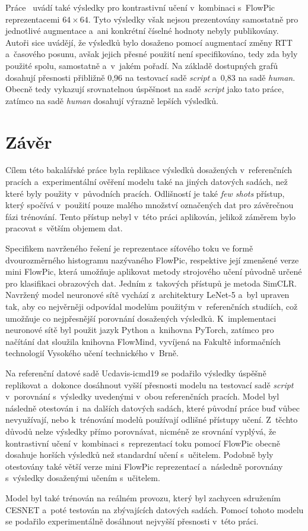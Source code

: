 Práce~\cite{flowpic_augmentations} uvádí také výsledky pro kontrastivní učení v~kombinaci s~FlowPic reprezentacemi $64\times64$. Tyto výsledky však nejsou prezentovány samostatně pro jednotlivé augmentace a~ani konkrétní číselné hodnoty nebyly publikovány. Autoři sice uvádějí, že výsledků bylo dosaženo pomocí augmentací změny RTT a~časového posunu, avšak jejich přesné použití není specifikováno, tedy zda byly použité spolu, samostatně a~v~jakém pořadí. Na základě dostupných grafů dosahují přesnosti přibližně 0,96 na testovací sadě \textit{script} a~0,83 na sadě \textit{human}. Obecně tedy vykazují srovnatelnou úspěšnost na sadě \textit{script} jako tato práce, zatímco na sadě \textit{human} dosahují výrazně lepších výsledků.
\chapter{Závěr}
Cílem této bakalářské práce byla replikace výsledků dosažených v~referenčních pracích a~experimentální ověření modelu také na jiných datových sadách, než které byly použity v~původních pracích. Odlišností je také \textit{few shots} přístup, který spočívá v~použití pouze malého množství označených dat pro závěrečnou fázi trénování. Tento přístup nebyl v~této práci aplikován, jelikož záměrem bylo pracovat s~větším objemem dat. 

Specifikem navrženého řešení je reprezentace síťového toku ve formě dvourozměrného histogramu nazývaného FlowPic, respektive její zmenšené verze mini FlowPic, která umožňuje aplikovat metody strojového učení původně určené pro klasifikaci obrazových dat. Jedním z~takových přístupů je metoda SimCLR. Navržený model neuronové sítě vychází z~architektury LeNet-5 a~byl upraven tak, aby co nejvěrněji odpovídal modelům použitým v~referenčních studiích, což umožňuje co nejpřesnější porovnání dosažených výsledků. K~implementaci neuronové sítě byl použit jazyk Python a~knihovna PyTorch, zatímco pro načítání dat sloužila knihovna FlowMind, vyvíjená na Fakultě informačních technologií Vysokého učení technického v~Brně.

Na referenční datové sadě Ucdavis-icmd19 se podařilo výsledky úspěšně replikovat a~dokonce dosáhnout vyšší přesnosti modelu na testovací sadě \textit{script} v~porovnání s~výsledky uvedenými v~obou referenčních pracích. Model byl následně otestován i~na dalších datových sadách, které původní práce buď vůbec nevyužívají, nebo k~trénování modelů používají odlišné přístupy učení. Z~těchto důvodů nelze výsledky přímo porovnávat, nicméně ze srovnání vyplývá, že kontrastivní učení v~kombinaci s~reprezentací toku pomocí FlowPic obecně dosahuje horších výsledků než standardní učení s~učitelem. Podobně byly otestovány také větší verze mini FlowPic reprezentací a~následně porovnány s~výsledky dosaženými učením s~učitelem.

Model byl také trénován na reálném provozu, který byl zachycen sdružením CESNET a~poté testován na zbývajících datových sadách. Pomocí tohoto modelu se podařilo experimentálně dosáhnout nejvyšší přesnosti v~této práci.